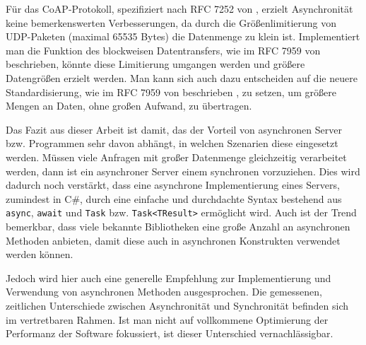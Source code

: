Für das CoAP-Protokoll, spezifiziert nach RFC 7252 von \citeauthor{RFC7252} \cite{RFC7252}, erzielt Asynchronität keine bemerkenswerten Verbesserungen, da durch die Größenlimitierung von UDP-Paketen (maximal 65535 Bytes) die Datenmenge zu klein ist. Implementiert man die Funktion des blockweisen Datentransfers, wie im RFC 7959 von \citeauthor{RFC7959}  \cite{RFC7959} beschrieben, könnte diese Limitierung umgangen werden und größere Datengrößen erzielt werden. Man kann sich auch dazu entscheiden auf die neuere Standardisierung, wie im RFC 7959 von \citeauthor{RFC7959} beschrieben \cite{RFC7959}, zu setzen, um größere Mengen an Daten, ohne großen Aufwand, zu übertragen.

Das Fazit aus dieser Arbeit ist damit, das der Vorteil von asynchronen Server bzw. Programmen sehr davon abhängt, in welchen Szenarien diese eingesetzt werden. Müssen viele Anfragen mit großer Datenmenge gleichzeitig verarbeitet werden, dann ist ein asynchroner Server einem synchronen vorzuziehen. Dies wird dadurch noch verstärkt, dass eine asynchrone Implementierung eines Servers, zumindest in C\#, durch eine einfache und durchdachte Syntax bestehend aus \texttt{async}, \texttt{await} und \texttt{Task} bzw. \texttt{Task<TResult>} ermöglicht wird. Auch ist der Trend bemerkbar, dass viele bekannte Bibliotheken eine große Anzahl an asynchronen Methoden anbieten, damit diese auch in asynchronen Konstrukten verwendet werden können.

Jedoch wird hier auch eine generelle Empfehlung zur Implementierung und Verwendung von asynchronen Methoden ausgesprochen. Die gemessenen, zeitlichen Unterschiede zwischen Asynchronität und Synchronität befinden sich im vertretbaren Rahmen. Ist man nicht auf vollkommene Optimierung der Performanz der Software fokussiert, ist dieser Unterschied vernachlässigbar.
